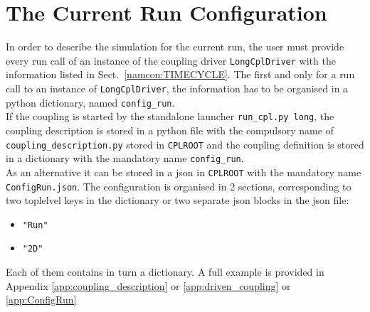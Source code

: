 \documentclass[Coupling]{../../data/TelemacDoc} %
\begin{document}
 
\section{The Current Run Configuration}\label{json:ConfigRun}
In order to describe the simulation for the current run, the user must provide every
run call of an instance of the coupling driver \texttt{LongCplDriver}
with the information listed in Sect.~\ref{namcon:TIMECYCLE}.
The first and only for a run call to an instance of
\texttt{LongCplDriver}, the information has to be
organised in a python dictionary, named \texttt{config\_run}.\\

If the coupling is started by the standalone launcher
\texttt{run\_cpl.py long}, the coupling description is stored in
a python file with the compulsory name of \texttt{coupling\_description.py} stored in
\texttt{CPLROOT} and the coupling definition is stored in a
dictionary with the mandatory name \texttt{config\_run}.\\
As an alternative it can be stored in a json in
\texttt{CPLROOT} with the mandatory name\\
\texttt{ConfigRun.json}. The configuration is organised in 2 sections, corresponding
to two toplelvel keys in the dictionary or two separate json
blocks in the json file:
\begin{itemize}
\item\texttt{"Run"}
\item\texttt{"2D"}
\end{itemize}

Each of them contains in turn a dictionary. A full example is provided in Appendix  \ref{app:coupling_description}
or \ref{app:driven_coupling} or \ref{app:ConfigRun}
\end{document}
